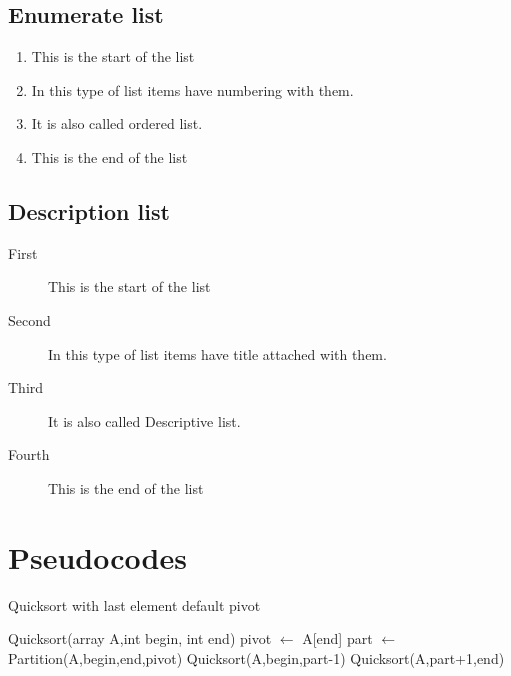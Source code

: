 \documentclass{article}
\begin{document}
\subsection{Enumerate list}
\begin{enumerate}
    \item This is the start of the list
    \item In this type of list items have numbering with them.
    \item It is also called ordered list.
    \item This is the end of the list
\end{enumerate}
\subsection{Description list}
\begin{description}
    \item [First] 
    This is the start of the list
    \item [Second] 
    In this type of list items have title attached  with them.
    \item [Third]
    It is also called Descriptive list.
    \item [Fourth]
    This is the end of the list
\end{description}

\newpage
\section{Pseudocodes}
\begin{algorithm}
\Large
\caption{\Large Quicksort with last element default pivot}
\begin{algorithmic}
\STATE Quicksort(array A,int begin, int end)
\STATE pivot $\leftarrow$ A[end]
\STATE part $\leftarrow$ Partition(A,begin,end,pivot)
\STATE Quicksort(A,begin,part-1)
\STATE Quicksort(A,part+1,end)
\ENDIF
\end{algorithmic}
\end{algorithm}
\end{document}
